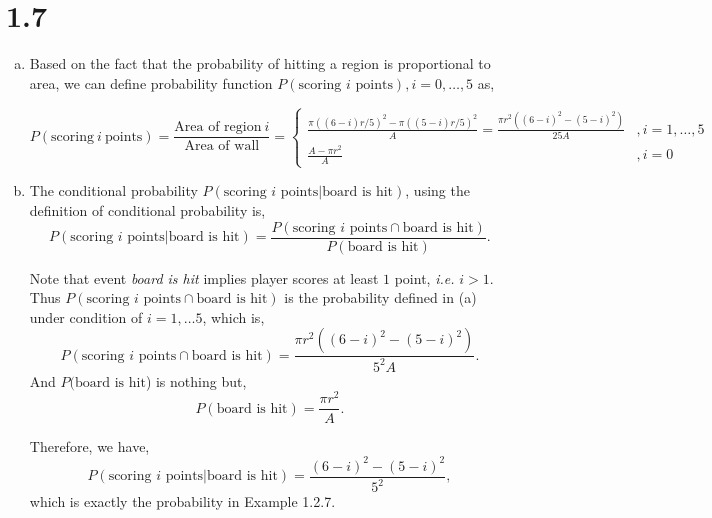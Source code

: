 \documentclass[letterpaper]{article}
\begin{document}
    \section*{1.7}
    \begin{enumerate}[(a)]
        \item Based on the fact that the probability of hitting a region is
        proportional to area, we can define probability function
        $P(\text{scoring $i$ points}), i=0,\dots,5$ as,

        \[
        P(\text{scoring}~i~\text{points}) = \frac{\text{Area of
        region}~i}{\text{Area of wall}} = 
        \begin{cases}
        \frac{\pi ((6-i)r/5)^2 - \pi((5-i)r/5)^2}{A} = \frac{\pi r^2
        \left((6-i)^2 - (5-i)^2\right)}{25A} &,  i = 1, \dots, 5\\
        \frac{A-\pi r^2}{A} &, i = 0
        \end{cases}
        \]
        \item The conditional probability 
        $P(\text{scoring $i$ points}|\text{board is hit})$, using the
        definition of conditional probability is,
        \[
        P(\text{scoring $i$ points}|\text{board is hit}) = \frac{
        P(\text{scoring $i$ points} \cap \text{board is hit})}{
        P(\text{board is hit})
        }.
        \]

        Note that event \emph{board is hit} implies player scores at least $1$
        point, \emph{i.e.} $i > 1$. 
        Thus $P(\text{scoring $i$ points} \cap \text{board is hit})$ is the
        probability defined in (a) under condition of $i=1, \dots 5$, which is,
        \[
        P(\text{scoring $i$ points} \cap \text{board is hit}) = \frac{\pi r^2
        \left((6-i)^2 - (5-i)^2\right)}{5^2A}.
        \]
        And $P(\text{board is hit}$) is nothing but, 
        \[
        P(\text{board is hit}) = \frac{\pi r^2}{A}.
        \]

        Therefore, we have,
        \[
        P(\text{scoring $i$ points}|\text{board is hit}) = \frac{(6-i)^2 -
        (5-i)^2}{5^2},
        \]
        which is exactly the probability in Example 1.2.7.

    \end{enumerate}
\end{document}
